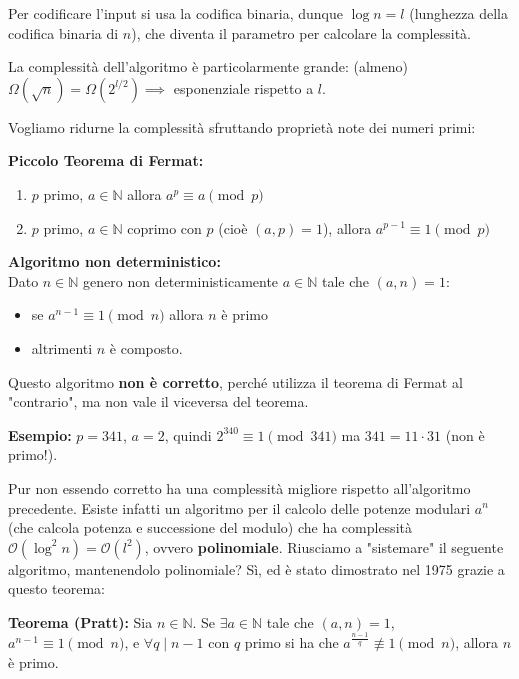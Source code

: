 Per codificare l'input si usa la codifica binaria, dunque $\log n = l$ (lunghezza della codifica binaria di $n$), che diventa il parametro per calcolare la complessità.

La complessità dell'algoritmo è particolarmente grande: (almeno) $\Omega(\sqrt{n}) = \Omega(2^{l/2}) \implies$ esponenziale rispetto a $l$.

Vogliamo ridurne la complessità sfruttando proprietà note dei numeri primi:

\vspace{0.4cm}
\textbf{Piccolo Teorema di Fermat:}
\begin{enumerate}
    \item $p$ primo, $a \in \mathbb{N}$ allora $a^p \equiv a \pmod p$
    \item $p$ primo, $a \in \mathbb{N}$ coprimo con $p$ (cioè $(a,p)=1$), allora $a^{p-1} \equiv 1 \pmod p$
\end{enumerate}

\vspace{0.4cm}
\textbf{Algoritmo non deterministico:} \\
Dato $n \in \mathbb{N}$ genero non deterministicamente $a \in \mathbb{N}$ tale che $(a,n)=1$:
\begin{itemize}
    \item se $a^{n-1} \equiv 1 \pmod n$ allora $n$ è primo
    \item altrimenti $n$ è composto.
\end{itemize}

Questo algoritmo \textbf{non è corretto}, perché utilizza il teorema di Fermat al "contrario", ma non vale il viceversa del teorema.

\vspace{0.4cm}
\textbf{Esempio:} $p = 341$, $a = 2$, quindi $2^{340} \equiv 1 \pmod{341}$ ma $341 = 11 \cdot 31$ (non è primo!).

Pur non essendo corretto ha una complessità migliore rispetto all'algoritmo precedente.
Esiste infatti un algoritmo per il calcolo delle potenze modulari $a^n$ (che calcola potenza e successione del modulo) che ha complessità $\mathcal{O}(\log^2 n) = \mathcal{O}(l^2)$, ovvero \textbf{polinomiale}.
Riusciamo a "sistemare" il seguente algoritmo, mantenendolo polinomiale? Sì, ed è stato dimostrato nel 1975 grazie a questo teorema:

\vspace{0.4cm}
\textbf{Teorema (Pratt):} Sia $n \in \mathbb{N}$. Se $\exists a \in \mathbb{N}$ tale che $(a,n)=1$, $a^{n-1} \equiv 1 \pmod n$, e $\forall q \mid n-1$ con $q$ primo si ha che $a^{\frac{n-1}{q}} \not\equiv 1 \pmod n$, allora $n$ è primo.

